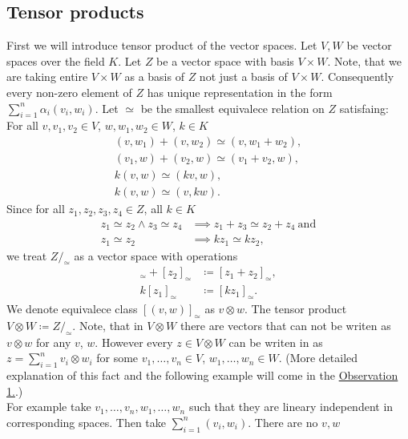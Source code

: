 \documentclass[a4paper, 12pt]{report}
\begin{document}
\subsection{Tensor products}
%
First we will introduce tensor product of the vector spaces. Let $V, W$ be vector spaces over the field $K$.
Let $Z$ be a vector space with basis $V \times W$. Note, that we are taking entire $V \times W$ as a basis
of $Z$ not just a basis of $V \times W$. Consequently every non-zero element of $Z$ has unique
representation in the form
$\displaystyle\sum^n_{i = 1}\alpha_i(v_i,w_i)$.
Let $\simeq$ be the smallest equivalece relation on $Z$ satisfaing: \\
%
For all $v,v_1,v_2 \in V$, $w, w_1, w_2 \in W$, $k \in K$
\begin{gather*}
(v,w_1) + (v, w_2) \simeq (v, w_1 + w_2), \\
(v_1,w) +(v_2, w) \simeq (v_1+v_2,w), \\
k(v, w) \simeq (kv, w), \\
k(v, w) \simeq (v, kw).
\end{gather*}
Since for all $z_1, z_2, z_3, z_4 \in Z$, all $k \in K$
\begin{align*}
z_1 \simeq z_2 \land z_3 \simeq z_4 &\implies z_1 + z_3 \simeq z_2 + z_4 \mathrm{\ and} \\
z_1 \simeq z_2 &\implies kz_1 \simeq kz_2,
\end{align*}
%
we treat $Z/_\simeq$ as a vector space with operations
%
\begin{align*}
[z_1]_\simeq + [z_2]_\simeq &\coloneqq [z_1 + z_2]_\simeq, \\
k[z_1]_\simeq &\coloneqq [kz_1]_\simeq.
\end{align*}
%
We denote equivalece class $[(v,w)]_\simeq$ as $v \otimes w$.
The tensor product $V \otimes W \coloneqq Z/_\simeq$.
Note, that in $V \otimes W$ there are vectors that can not be writen as $v \otimes w$ for any $v$, $w$.
However every $z \in V \otimes W$ can be writen in as $z =\displaystyle\sum^n_{i = 1}v_i \otimes w_i$
for some $v_1, \dots, v_n \in V$, $w_1, \dots, w_n \in W$.
(More detailed explanation of this fact and the following example will come in the
\hyperref[observation:1]{Observation 1.}.)\\
For example take $v_1,\dots, v_n, w_1, \dots, w_n$ such that they are lineary independent
in corresponding spaces.
Then take $\displaystyle\sum^n_{i=1}(v_i,w_i)$. There are no $v, w$
\end{document}
